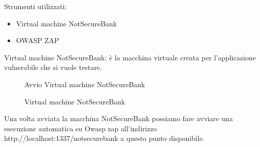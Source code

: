 Strumenti utilizzati:
\begin{itemize}
    \item Virtual machine NotSecureBank
    \item OWASP ZAP
\end{itemize}  
Virtual machine NotSecureBank:  è la macchina virtuale creata per l’applicazione vulnerabile che si vuole testare.
\begin{figure}[H]
    \caption{Avvio Virtual machine NotSecureBank}
    \label{fig:avviovm}
\end{figure}
\begin{figure}[H]
    \caption{Virtual machine NotSecureBank}
    \label{fig:vm}
\end{figure}
Una volta avviata la macchina NotSecureBank possiamo fare avviare una esecuzione automatica su Owasp zap all'indirizzo http://localhost:1337/notsecurebank a questo punto disponibile.

